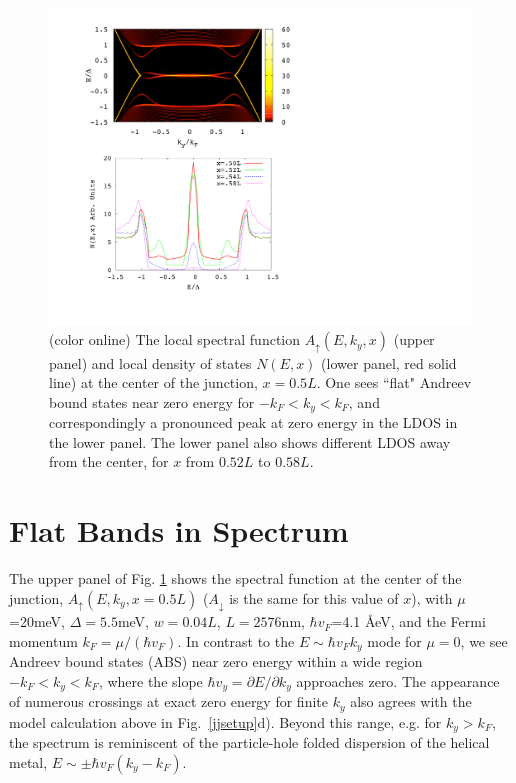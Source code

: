 \begin{figure}[]
\includegraphics[width=\textwidth]{include/fig2.pdf}
\caption{(color online) The local spectral function $A_\uparrow(E,k_y,x)$
(upper panel) and local density of states $N(E,x)$ (lower panel,
red solid line) at the center of the junction,
$x=0.5L$. One sees ``flat" Andreev bound states near
zero energy for $-k_F<k_y<k_F$, and correspondingly a pronounced peak
at zero energy in the LDOS in the lower panel.
The lower panel also shows different LDOS away from the center,
for $x$ from $0.52L$ to $0.58L$. } \label{dosf}
\end{figure}

\section{Flat Bands in Spectrum}
The upper panel of Fig. \ref{dosf} shows the spectral function
at the center of the junction, $A_\uparrow(E,k_y,x=0.5L)$ ($A_\downarrow$ is the
same for this value of $x$), with $\mu$=20meV,
$\Delta=5.5$meV,  $w=0.04L$, $L= 2576$nm, 
$ \hbar v_F$=4.1 \AA eV, and the Fermi momentum $k_{F}=\mu/(\hbar v_F)$.
In contrast to the $E\sim \hbar v_F k_y$ mode for $\mu=0$, we see 
Andreev bound states (ABS) near zero energy within a wide region $-k_F<k_y<k_F$,
where the slope $\hbar v_y=\partial E / \partial k_y$ approaches zero. 
The appearance of numerous crossings at exact zero energy for finite $k_y$ 
also agrees with the model calculation above in Fig.~\ref{jjsetup}d). 
%
Beyond this range, e.g. for $k_y>k_F$, the spectrum is reminiscent 
of the particle-hole folded dispersion of the helical metal, 
$E\sim \pm \hbar v_F(k_y- k_F)$.
%

